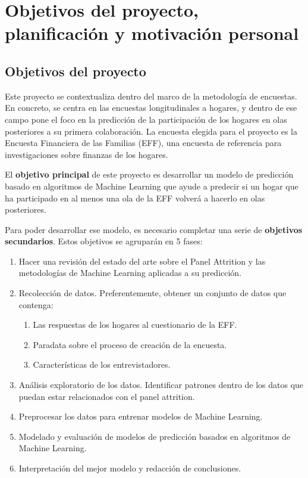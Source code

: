 \chapter{Objetivos del proyecto, planificación y motivación personal}
\label{chapter:objetivos}
\section{Objetivos del proyecto}

Este proyecto se contextualiza dentro del marco de la metodología de encuestas. En concreto, se centra en las encuestas longitudinales a hogares, y dentro de ese campo pone el foco en la predicción de la participación de los hogares en olas posteriores a su primera colaboración. La encuesta elegida para el proyecto es la Encuesta Financiera de las Familias (EFF), una encuesta de referencia para investigaciones sobre finanzas de los hogares.

El \textbf{objetivo principal} de este proyecto es desarrollar un modelo de predicción basado en algoritmos de Machine Learning que ayude a predecir si un hogar que ha participado en al menos una ola de la EFF volverá a hacerlo en olas posteriores.

Para poder desarrollar ese modelo, es necesario completar una serie de \textbf{objetivos secundarios}. Estos objetivos se agruparán en 5 fases:

\begin{enumerate}[noitemsep]
    \item Hacer una revisión del estado del arte sobre el Panel Attrition y las metodologías de Machine Learning aplicadas a su predicción.
    \item Recolección de datos. Preferentemente, obtener un conjunto de datos que contenga:
    \begin{enumerate}
        \item Las respuestas de los hogares al cuestionario de la EFF.
        \item Paradata sobre el proceso de creación de la encuesta.
        \item Características de los entrevistadores.
    \end{enumerate}
    \item Análisis exploratorio de los datos. Identificar patrones dentro de los datos que puedan estar relacionados con el panel attrition.
    \item Preprocesar los datos para entrenar modelos de Machine Learning.
    \item Modelado y evaluación de modelos de predicción basados en algoritmos de Machine Learning.
    \item Interpretación del mejor modelo y redacción de conclusiones.
\end{enumerate}

